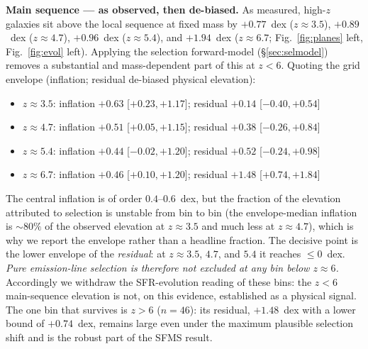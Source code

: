 \documentclass[twocolumn]{aastex631}
\begin{document}
\textbf{Main sequence --- as observed, then de-biased.} As measured, high-$z$ galaxies sit above the local sequence at fixed mass by $+0.77$~dex ($z\!\approx\!3.5$), $+0.89$~dex ($z\!\approx\!4.7$), $+0.96$~dex ($z\!\approx\!5.4$), and $+1.94$~dex ($z\!\approx\!6.7$; Fig.~\ref{fig:planes} left, Fig.~\ref{fig:evol} left). Applying the selection forward-model (\S\ref{sec:selmodel}) removes a substantial and mass-dependent part of this at $z<6$. Quoting the grid envelope (inflation; residual de-biased physical elevation):
\begin{itemize}
\item $z\!\approx\!3.5$: inflation $+0.63$ [$+0.23,+1.17$]; residual $+0.14$ [$-0.40,+0.54$]
\item $z\!\approx\!4.7$: inflation $+0.51$ [$+0.05,+1.15$]; residual $+0.38$ [$-0.26,+0.84$]
\item $z\!\approx\!5.4$: inflation $+0.44$ [$-0.02,+1.20$]; residual $+0.52$ [$-0.24,+0.98$]
\item $z\!\approx\!6.7$: inflation $+0.46$ [$+0.10,+1.20$]; residual $+1.48$ [$+0.74,+1.84$]
\end{itemize}
The central inflation is of order $0.4$--$0.6$~dex, but the fraction of the elevation attributed to selection is unstable from bin to bin (the envelope-median inflation is $\sim80\%$ of the observed elevation at $z\approx3.5$ and much less at $z\approx4.7$), which is why we report the envelope rather than a headline fraction. The decisive point is the lower envelope of the \emph{residual}: at $z\approx3.5$, $4.7$, and $5.4$ it reaches $\le0$~dex. \emph{Pure emission-line selection is therefore not excluded at any bin below $z\approx6$.} Accordingly we withdraw the SFR-evolution reading of these bins: the $z<6$ main-sequence elevation is not, on this evidence, established as a physical signal. The one bin that survives is $z>6$ ($n=46$): its residual, $+1.48$~dex with a lower bound of $+0.74$~dex, remains large even under the maximum plausible selection shift and is the robust part of the SFMS result.
\end{document}
